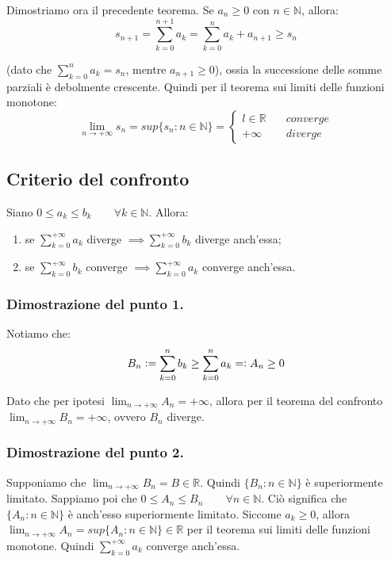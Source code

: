 \documentclass{article}
\begin{document}
\noindent Dimostriamo ora il precedente teorema. Se $a_n \geq 0$ con $n \in \mathbb{N}$, allora:
\begin{equation*}
    s_{n + 1} = \sum_{k = 0}^{n + 1} a_k = \sum_{k = 0}^n a_k + a_{n + 1} \geq s_n
\end{equation*}

\noindent (dato che $\sum_{k = 0}^n a_k = s_n$, mentre $a_{n + 1} \geq 0$), ossia la successione delle somme parziali è debolmente crescente. Quindi per il teorema sui limiti delle funzioni monotone:
\begin{equation*}
    \lim_{n \to +\infty} s_n = sup\{s_n : n \in \mathbb{N}\} = \begin{cases}
        l \in \mathbb{R} & \quad converge \\
        +\infty & \quad diverge
    \end{cases}
\end{equation*}

\subsection{Criterio del confronto}
Siano $0 \leq a_k \leq b_k \qquad \forall k \in \mathbb{N}$. Allora:
\begin{enumerate}
    \item se $\sum_{k = 0}^{+\infty} a_k$ diverge $\implies \sum_{k = 0}^{+\infty} b_k$ diverge anch'essa;
    \item se $\sum_{k = 0}^{+\infty} b_k$ converge $\implies \sum_{k = 0}^{+\infty} a_k$ converge anch'essa.
\end{enumerate}

\subsubsection{Dimostrazione del punto 1.}
Notiamo che:
\begin{equation*}
    B_n \vcentcolon = \sum_{k = 0}^n b_k \geq \sum_{k = 0}^n a_k = \vcentcolon A_n \geq 0
\end{equation*}

\noindent Dato che per ipotesi $\lim_{n \to +\infty} A_n = +\infty$, allora per il teorema del confronto $\lim_{n \to +\infty} B_n = +\infty$, ovvero $B_n$ diverge. 

\subsubsection{Dimostrazione del punto 2.}
Supponiamo che $\lim_{n \to +\infty} B_n = B \in \mathbb{R}$. Quindi $\{B_n : n \in \mathbb{N}\}$ è superiormente limitato. Sappiamo poi che $0 \leq A_n \leq B_n \qquad \forall n \in \mathbb{N}$. Ciò significa che $\{A_n : n \in \mathbb{N}\}$ è anch'esso superiormente limitato. Siccome $a_k \geq 0$, allora $\lim_{n \to +\infty} A_n = sup\{A_n : n \in \mathbb{N}\} \in \mathbb{R}$ per il teorema sui limiti delle funzioni monotone. Quindi $\sum_{k = 0}^{+\infty} a_k$ converge anch'essa.
\end{document}
